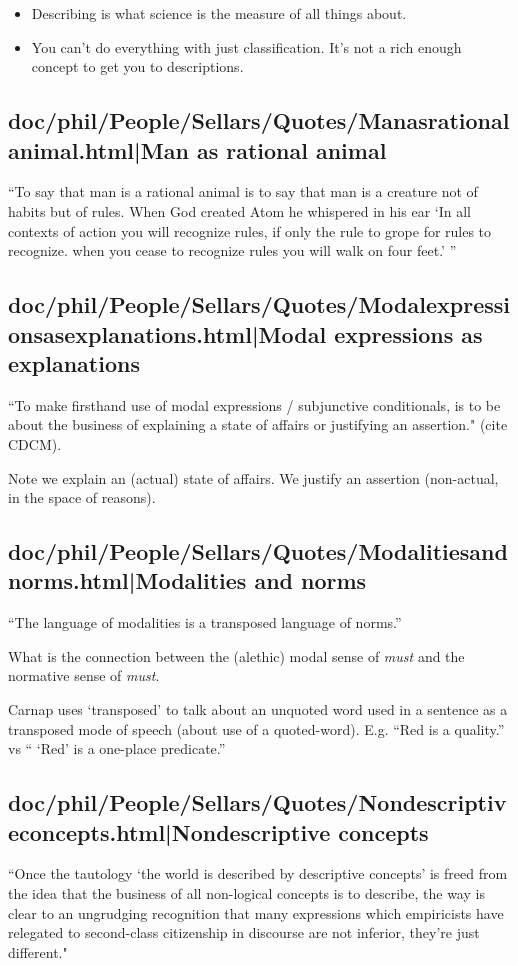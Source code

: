 \documentclass[12pt,a4paper]{report}
\begin{document}
\begin{itemize}
    \item Describing is what science is the measure of all things about.
    \item You can't do everything with just classification. It's not a rich
         enough concept to get you to descriptions.
\end{itemize}
\subsection{doc/phil/People/Sellars/Quotes/Manasrationalanimal.html|Man as rational animal}
``To say that man is a rational animal is to say that man is a creature not of
habits but of rules. When God created Atom he whispered in his ear `In all
contexts of action you will recognize rules, if only the rule to grope for rules
to recognize. when you cease to recognize rules you will walk on four feet.' ''

\subsection{doc/phil/People/Sellars/Quotes/Modalexpressionsasexplanations.html|Modal expressions as explanations}
``To make firsthand use of modal expressions / subjunctive conditionals, is to
be about the business of explaining a state of affairs or justifying an
assertion." (cite CDCM).

Note we explain an (actual) state of affairs. We justify an assertion
(non-actual, in the space of reasons).

\subsection{doc/phil/People/Sellars/Quotes/Modalitiesandnorms.html|Modalities and norms}
``The language of modalities is a transposed language of norms.''


What is the connection between the (alethic) modal sense of \emph{must} and the
 normative sense of \emph{must}.

Carnap uses `transposed' to talk about an unquoted word used in a sentence as a
transposed mode of speech (about use of a quoted-word). E.g. ``Red is a
quality.'' vs `` `Red' is a one-place predicate.''

\subsection{doc/phil/People/Sellars/Quotes/Nondescriptiveconcepts.html|Nondescriptive concepts}
``Once the tautology `the world is described by descriptive concepts' is freed
from the idea that the business of all non-logical concepts is to describe, the
 way is clear to an ungrudging recognition that many expressions which
 empiricists have relegated to second-class citizenship in discourse are not
 inferior, they're just different."
\end{document}
